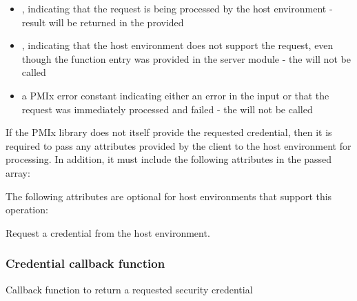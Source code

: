 \begin{itemize}
    \item {}, indicating that the request is being processed by the host environment - result will be returned in the provided 
    \item {}, indicating that the host environment does not support the request, even though the function entry was provided in the server module - the  will not be called
    \item a PMIx error constant indicating either an error in the input or that the request was immediately processed and failed - the  will not be called
\end{itemize}

\reqattrstart
If the \ac{PMIx} library does not itself provide the requested credential, then it is required to pass any attributes provided by the client to the host environment for processing. In addition, it must include the following attributes in the passed  array:


\reqattrend

\optattrstart
The following attributes are optional for host environments that support this operation:


\optattrend

\descr

Request a credential from the host environment.


\subsubsection{Credential callback function}

\summary

Callback function to return a requested security credential

\format


